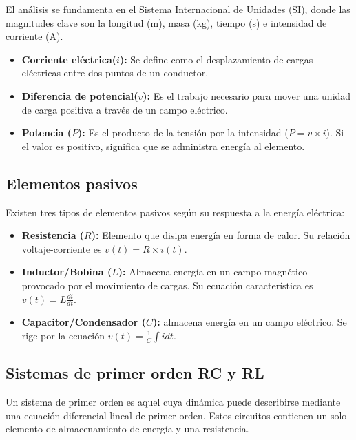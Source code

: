 \documentclass[letter,11pt]{article}
\begin{document}
		El análisis se fundamenta en el Sistema Internacional de Unidades (SI), donde las magnitudes clave son la longitud (m), masa (kg), tiempo (s) e intensidad de corriente (A).
		
		\begin{itemize}
			\item \textbf{Corriente eléctrica($i$):} Se define como el desplazamiento de cargas eléctricas entre dos puntos de un conductor.
			\item \textbf{Diferencia de potencial($v$):} Es el trabajo necesario para mover una unidad de carga positiva a través de un campo eléctrico.
			\item \textbf{Potencia ($P$):} Es el producto de la tensión por la intensidad ($P = v \times i$). Si el valor es positivo, significa que se administra energía al elemento.
		\end{itemize}
	
	\subsection{Elementos pasivos}
	
		Existen tres tipos de elementos pasivos según su respuesta a la energía eléctrica:
		
		\begin{itemize}
			\item \textbf{Resistencia ($R$):} Elemento que disipa energía en forma de calor. Su relación voltaje-corriente es $v(t) = R \times i(t)$.
			\item \textbf{Inductor/Bobina ($L$):} Almacena energía en un campo magnético provocado por el movimiento de cargas. Su ecuación característica es $v(t) = L\frac{di}{dt}$.
			\item \textbf{Capacitor/Condensador ($C$):} almacena energía en un campo eléctrico. Se rige por la ecuación $v(t) = \frac{1}{C}\int idt$.
		\end{itemize}
	
	\subsection{Sistemas de primer orden RC y RL}
	
		Un sistema de primer orden es aquel cuya dinámica puede describirse mediante una ecuación diferencial lineal de primer orden. 
		Estos circuitos contienen un solo elemento de almacenamiento de energía y una resistencia.
		
\end{document}
